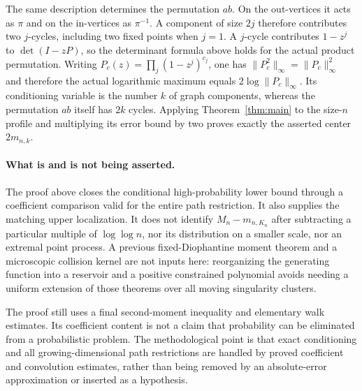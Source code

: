 \documentclass[11pt]{article}
\theoremstyle{definition}\newtheorem{definition}[theorem]{Definition}
\theoremstyle{remark}\newtheorem{remark}[theorem]{Remark}
\numberwithin{equation}{section}\allowdisplaybreaks
\begin{document}
The same description determines the permutation
$ab$. On the out-vertices it acts as $\pi$ and on
the in-vertices as $\pi^{-1}$. A component of size
$2j$ therefore contributes two $j$-cycles, including
two fixed points when $j=1$. A $j$-cycle contributes
$1-z^j$ to $\det(I-zP)$, so the determinant formula
above holds for the actual product permutation.
Writing $P_c(z)=\prod_j(1-z^j)^{c_j}$, one has
$\|P_c^2\|_\infty=\|P_c\|_\infty^2$ and therefore
the actual logarithmic maximum equals
$2\log\|P_c\|_\infty$. Its conditioning variable
is the number $k$ of graph components, whereas
the permutation $ab$ itself has $2k$ cycles.
Applying Theorem~\ref{thm:main} to the size-$n$
profile and multiplying its error bound by two
proves exactly the asserted center $2m_{n,k}$.


\paragraph{What is and is not being asserted.}
The proof above closes the conditional high-probability lower bound
through a coefficient comparison valid for the entire path restriction.
It also supplies the matching upper localization. It does not identify
$M_n-m_{n,K_n}$ after subtracting a particular multiple of $\log\log n$,
nor its distribution on a smaller scale, nor an extremal point process.
A previous fixed-Diophantine moment theorem and a microscopic collision
kernel are not inputs here: reorganizing the generating function into a
reservoir and a positive constrained polynomial avoids needing a uniform
extension of those theorems over all moving singularity clusters.

The proof still uses a final second-moment inequality and elementary
walk estimates. Its coefficient content is not a claim that probability
can be eliminated from a probabilistic problem. The methodological point
is that exact conditioning and all growing-dimensional path restrictions
are handled by proved coefficient and convolution estimates, rather than
being removed by an absolute-error approximation or inserted as a
hypothesis.
\end{document}
